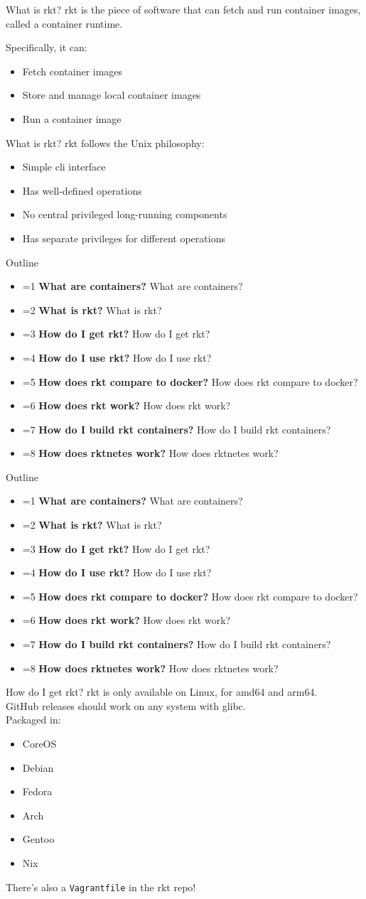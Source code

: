 \documentclass[pdf,aspectratio=169,14pt]{beamer}
\newcommand{\mbold}[3]{
    \ifnum #1=#2
        \textbf{#3}
    \else
        #3
    \fi
}
\newcommand{\outline}[1]{
    \begin{frame}
        Outline
        \begin{itemize}
            \item \mbold{#1}{1}{What are containers?}
            \item \mbold{#1}{2}{What is rkt?}
            \item \mbold{#1}{3}{How do I get rkt?}
            \item \mbold{#1}{4}{How do I use rkt?}
            \item \mbold{#1}{5}{How does rkt compare to docker?}
            \item \mbold{#1}{6}{How does rkt work?}
            \item \mbold{#1}{7}{How do I build rkt containers?}
            \item \mbold{#1}{8}{How does rktnetes work?}
        \end{itemize}
    \end{frame}
}
\begin{document}
\begin{frame}{What is rkt?}
    rkt is the piece of software that can fetch and run container images,
    called a container runtime.

    Specifically, it can:
    \begin{itemize}
        \pause
        \item Fetch container images
        \pause
        \item Store and manage local container images
        \pause
        \item Run a container image
    \end{itemize}
\end{frame}

\begin{frame}{What is rkt?}
    rkt follows the Unix philosophy:
    \begin{itemize}
        \pause
        \item Simple cli interface
        \pause
        \item Has well-defined operations
        \pause
        \item No central privileged long-running components
        \pause
        \item Has separate privileges for different operations
    \end{itemize}
\end{frame}


\outline{2}
\outline{3}

\begin{frame}{How do I get rkt?}
    rkt is only available on Linux, for amd64 and arm64. \\
    GitHub releases should work on any system with glibc. \\
    \pause
    \vspace{1em}
    Packaged in:
    \begin{itemize}
        \item CoreOS
        \item Debian
        \item Fedora
        \item Arch
        \item Gentoo
        \item Nix
    \end{itemize}
    \pause
    There's also a \texttt{Vagrantfile} in the rkt repo!
\end{frame}
\end{document}
